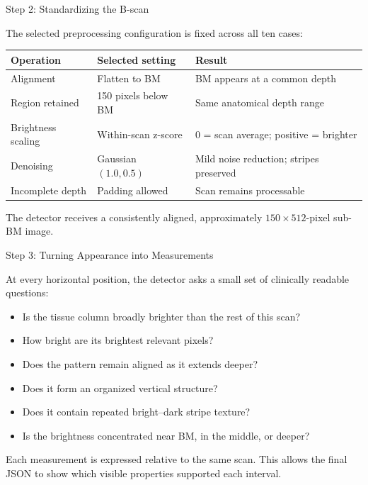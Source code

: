 \documentclass[aspectratio=169]{beamer}
\begin{document}
\begin{frame}{Step 2: Standardizing the B-scan}

The selected preprocessing configuration is fixed across all ten cases:

\begin{table}
\centering
\small
\begin{tabular}{lll}
\toprule
\textbf{Operation} & \textbf{Selected setting} & \textbf{Result} \\
\midrule
Alignment & Flatten to BM & BM appears at a common depth \\
Region retained & 150 pixels below BM & Same anatomical depth range \\
Brightness scaling & Within-scan z-score & 0 = scan average; positive = brighter \\
Denoising & Gaussian $(1.0,0.5)$ & Mild noise reduction; stripes preserved \\
Incomplete depth & Padding allowed & Scan remains processable \\
\bottomrule
\end{tabular}
\end{table}

The detector receives a consistently aligned, approximately
$150\times512$-pixel sub-BM image.

\end{frame}

\begin{frame}{Step 3: Turning Appearance into Measurements}

At every horizontal position, the detector asks a small set of clinically
readable questions:

\begin{itemize}
    \item Is the tissue column broadly brighter than the rest of this scan?
    \item How bright are its brightest relevant pixels?
    \item Does the pattern remain aligned as it extends deeper?
    \item Does it form an organized vertical structure?
    \item Does it contain repeated bright--dark stripe texture?
    \item Is the brightness concentrated near BM, in the middle, or deeper?
\end{itemize}

Each measurement is expressed relative to the same scan. This allows the final
JSON to show which visible properties supported each interval.

\end{frame}
\end{document}
